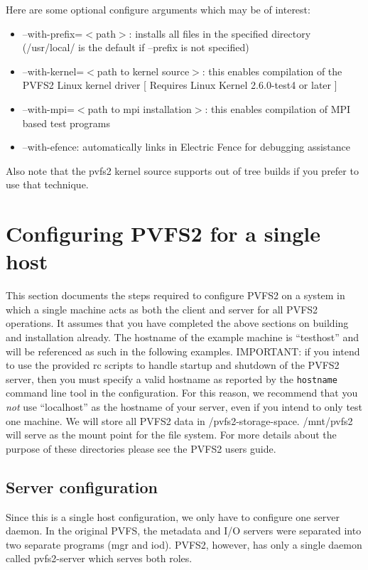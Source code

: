\documentclass[11pt, letterpaper]{article}
\begin{document}
Here are some optional configure arguments which may be of interest:
\begin{itemize}
\item --with-prefix=$<$path$>$: installs all files in the specified directory
(/usr/local/ is the default if --prefix is not specified)
\item --with-kernel=$<$path to kernel source$>$: this enables compilation of
the PVFS2 Linux kernel driver [ Requires Linux Kernel 2.6.0-test4 or later ]
\item --with-mpi=$<$path to mpi installation$>$: this enables compilation of MPI
based test programs
\item --with-efence: automatically links in Electric Fence for debugging assistance
\end{itemize}

Also note that the pvfs2 kernel source supports out of tree builds if you 
prefer to use that technique.

\section{Configuring PVFS2 for a single host}
\label{sec:single}

This section documents the steps required to configure PVFS2 on a system
in which a single machine acts as both the client and server for all
PVFS2 operations.  It assumes that you have completed the above sections
on building and installation already.  The hostname of the example machine
is ``testhost'' and will be referenced as such in the following examples.
IMPORTANT: if you intend to use the provided rc scripts to handle startup
and shutdown of the PVFS2 server, then you must specify a valid hostname 
as reported by the \texttt{hostname} command line tool in the configuration.
For this reason, we recommend that you \emph{not} use ``localhost'' as 
the hostname of your server, even if you intend to only test one machine.
We will store all PVFS2 data in /pvfs2-storage-space.  /mnt/pvfs2 will
serve as the mount point for the file system.  For more details about
the purpose of these directories please see the PVFS2 users guide.

\subsection{Server configuration}

Since this is a single host configuration, we only have to configure one
server daemon.  In the original PVFS, the metadata and I/O servers were 
separated into two separate programs (mgr and iod).  PVFS2, however, has 
only a single daemon called pvfs2-server which serves both roles.
\end{document}
